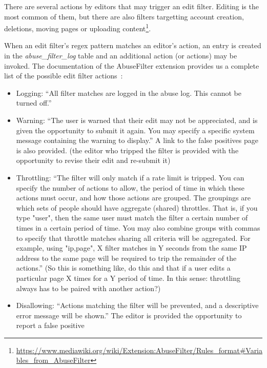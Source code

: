 There are several actions by editors that may trigger an edit filter.
Editing is the most common of them, but there are also filters targetting account creation, deletions, moving pages or uploading content\footnote{\url{https://www.mediawiki.org/wiki/Extension:AbuseFilter/Rules_format\#Variables_from_AbuseFilter}}.

When an edit filter's regex pattern matches an editor's action, an entry is created in the \emph{abuse\_filter\_log} table and an additional action (or actions) may be invoked.
The documentation of the AbuseFilter extension provides us a complete list of the possible edit filter actions~\cite{Mediawiki:AbuseFilterActions}:
\begin{itemize}
    \item Logging: ``All filter matches are logged in the abuse log. This cannot be turned off.''
    \item Warning: ``The user is warned that their edit may not be appreciated, and is given the opportunity to submit it again. You may specify a specific system message containing the warning to display.'' A link to the false positives page~\cite{Wikipedia:EditFilterFalsePositives} is also provided. (the editor who tripped the filter is provided with the opportunity to revise their edit and re-submit it)
    \item Throttling: ``The filter will only match if a rate limit is tripped. You can specify the number of actions to allow, the period of time in which these actions must occur, and how those actions are grouped.
         The groupings are which sets of people should have aggregate (shared) throttles. That is, if you type "user", then the same user must match the filter a certain number of times in a certain period of time. You may also combine groups with commas to specify that throttle matches sharing all criteria will be aggregated. For example, using "ip,page", X filter matches in Y seconds from the same IP address to the same page will be required to trip the remainder of the actions.''
         (So this is something like, do this and that if a user edits a particular page X times for a Y period of time. In this sense: throttling always has to be paired with another action?)
    \item Disallowing: ``Actions matching the filter will be prevented, and a descriptive error message will be shown.'' The editor is provided the opportunity to report a false positive

\end{itemize}
